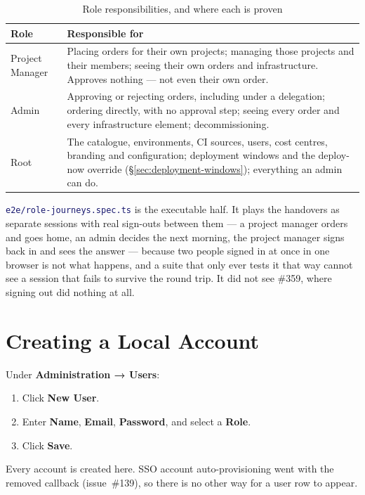 \documentclass[12pt,a4paper,twoside]{report}
\newcommand{\file}[1]{\texttt{\textcolor{MidnightBlue}{#1}}}
\begin{document}
\begin{table}[H]
  \centering
  \caption{Role responsibilities, and where each is proven}
  \begin{tabularx}{\linewidth}{@{}l>{\raggedright\arraybackslash}X@{}}
    \toprule
    \textbf{Role} & \textbf{Responsible for} \\
    \midrule
    Project Manager & Placing orders for their own projects; managing those
      projects and their members; seeing their own orders and infrastructure.
      Approves nothing --- not even their own order. \\
    Admin & Approving or rejecting orders, including under a delegation;
      ordering directly, with no approval step; seeing every order and every
      infrastructure element; decommissioning. \\
    Root & The catalogue, environments, CI sources, users, cost centres,
      branding and configuration; deployment windows and the deploy-now
      override (\S\ref{sec:deployment-windows}); everything an admin can do. \\
    \bottomrule
  \end{tabularx}
\end{table}

\noindent \file{e2e/role-journeys.spec.ts} is the executable half. It plays the
handovers as separate sessions with real sign-outs between them --- a project
manager orders and goes home, an admin decides the next morning, the project
manager signs back in and sees the answer --- because two people signed in at
once in one browser is not what happens, and a suite that only ever tests it
that way cannot see a session that fails to survive the round trip. It did not
see \#359, where signing out did nothing at all.

\section{Creating a Local Account}

Under \textbf{Administration → Users}:

\begin{enumerate}
  \item Click \textbf{New User}.
  \item Enter \textbf{Name}, \textbf{Email}, \textbf{Password}, and
        select a \textbf{Role}.
  \item Click \textbf{Save}.
\end{enumerate}

Every account is created here. SSO account auto-provisioning went with the
removed callback (issue~\#139), so there is no other way for a user row to
appear.
\end{document}
